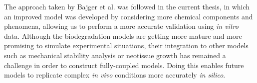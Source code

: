The approach taken by Bajger et al. was followed in the current thesis, in which an improved model was developed by considering more chemical components and phenomena, allowing us to perform a more accurate validation using \textit{in vitro} data.  Although the biodegradation models are getting more mature and more promising to simulate experimental situations, their integration to other models such as mechanical stability analysis or neotissue growth has remained a challenge in order to construct fully-coupled models. Doing this enables future models to replicate complex \textit{in vivo} conditions more accurately \textit{in silico}.


%




\cleardoublepage

